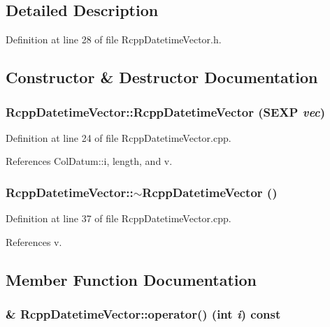 \subsection{Detailed Description}


Definition at line 28 of file RcppDatetimeVector.h.

\subsection{Constructor \& Destructor Documentation}
\hypertarget{classRcppDatetimeVector_a1c1d1e2087fdc8e7601299dc2c4fe24c}{
\subsubsection[{RcppDatetimeVector}]{\setlength{\rightskip}{0pt plus 5cm}RcppDatetimeVector::RcppDatetimeVector (SEXP {\em vec})}}
\label{classRcppDatetimeVector_a1c1d1e2087fdc8e7601299dc2c4fe24c}


Definition at line 24 of file RcppDatetimeVector.cpp.

References ColDatum::i, length, and v.\hypertarget{classRcppDatetimeVector_a81d6c5daba7448058a2f896841ddeb3a}{
\subsubsection[{$\sim$RcppDatetimeVector}]{\setlength{\rightskip}{0pt plus 5cm}RcppDatetimeVector::$\sim$RcppDatetimeVector ()}}
\label{classRcppDatetimeVector_a81d6c5daba7448058a2f896841ddeb3a}


Definition at line 37 of file RcppDatetimeVector.cpp.

References v.

\subsection{Member Function Documentation}
\hypertarget{classRcppDatetimeVector_a5af7ec7f15263cee68ae11ce00770672}{
\subsubsection[{operator()}]{ \& RcppDatetimeVector::operator() (int {\em i}) const}}
\label{classRcppDatetimeVector_a5af7ec7f15263cee68ae11ce00770672}


